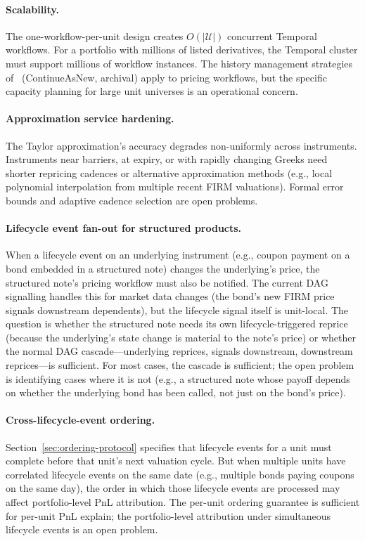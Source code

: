 \documentclass[11pt,a4paper]{article}
\begin{document}
\paragraph{Scalability.}  The one-workflow-per-unit design creates $O(|\mathcal{U}|)$ concurrent Temporal workflows.  For a portfolio with millions of listed derivatives, the Temporal cluster must support millions of workflow instances.  The history management strategies of~\cite[\S14.12]{ledger} (ContinueAsNew, archival) apply to pricing workflows, but the specific capacity planning for large unit universes is an operational concern.

\paragraph{Approximation service hardening.}  The Taylor approximation's accuracy degrades non-uniformly across instruments.  Instruments near barriers, at expiry, or with rapidly changing Greeks need shorter repricing cadences or alternative approximation methods (e.g., local polynomial interpolation from multiple recent FIRM valuations).  Formal error bounds and adaptive cadence selection are open problems.

\paragraph{Lifecycle event fan-out for structured products.}  When a lifecycle event on an underlying instrument (e.g., coupon payment on a bond embedded in a structured note) changes the underlying's price, the structured note's pricing workflow must also be notified.  The current DAG signalling handles this for market data changes (the bond's new FIRM price signals downstream dependents), but the lifecycle signal itself is unit-local.  The question is whether the structured note needs its own lifecycle-triggered reprice (because the underlying's state change is material to the note's price) or whether the normal DAG cascade---underlying reprices, signals downstream, downstream reprices---is sufficient.  For most cases, the cascade is sufficient; the open problem is identifying cases where it is not (e.g., a structured note whose payoff depends on whether the underlying bond has been called, not just on the bond's price).

\paragraph{Cross-lifecycle-event ordering.}  Section~\ref{sec:ordering-protocol} specifies that lifecycle events for a unit must complete before that unit's next valuation cycle.  But when multiple units have correlated lifecycle events on the same date (e.g., multiple bonds paying coupons on the same day), the order in which those lifecycle events are processed may affect portfolio-level PnL attribution.  The per-unit ordering guarantee is sufficient for per-unit PnL explain; the portfolio-level attribution under simultaneous lifecycle events is an open problem.
\end{document}
